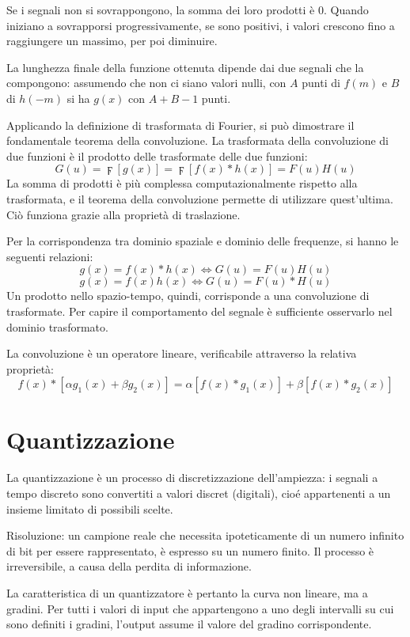 Se i segnali non si sovrappongono, la somma dei loro prodotti è 0. Quando iniziano a sovrapporsi progressivamente, se sono positivi, i valori crescono fino a raggiungere un massimo, per poi diminuire.

La lunghezza finale della funzione ottenuta dipende dai due segnali che la compongono: assumendo che non ci siano valori nulli, con $A$ punti di $f(m)$ e $B$ di $h(-m)$ si ha $g(x)$ con $A + B - 1$ punti.

Applicando la definizione di trasformata di Fourier, si può dimostrare il fondamentale teorema della convoluzione. La trasformata della convoluzione di due funzioni è il prodotto delle trasformate delle due funzioni: 
$$G(u) = \digamma[g(x)] = \digamma[f(x) * h(x)] = F(u)H(u)$$
La somma di prodotti è più complessa computazionalmente rispetto alla trasformata, e il teorema della convoluzione permette di utilizzare quest'ultima. Ciò funziona grazie alla proprietà di traslazione. 

Per la corrispondenza tra dominio spaziale e dominio delle frequenze, si hanno le seguenti relazioni:
$$g(x) = f(x) * h(x) \Longleftrightarrow G(u) = F(u)H(u)$$
$$g(x) = f(x)h(x) \Longleftrightarrow G(u) = F(u) * H(u)$$
Un prodotto nello spazio-tempo, quindi, corrisponde a una convoluzione di trasformate. Per capire il comportamento del segnale è sufficiente osservarlo nel dominio trasformato.

La convoluzione è un operatore lineare, verificabile attraverso la relativa proprietà:
$$f(x) * [\alpha g_1(x) + \beta g_2(x)] = \alpha[f(x) * g_1(x)] + \beta[f(x) * g_2(x)]$$

\section{Quantizzazione}
La quantizzazione è un processo di discretizzazione dell'ampiezza: i segnali a tempo discreto sono convertiti a valori discret (digitali), cioé appartenenti a un insieme limitato di possibili scelte.

Risoluzione: un campione reale che necessita ipoteticamente di un numero infinito di bit per essere rappresentato, è espresso su un numero finito. Il processo è irreversibile, a causa della perdita di informazione.

La caratteristica di un quantizzatore è pertanto la curva non lineare, ma a gradini. Per tutti i valori di input che appartengono a uno degli intervalli su cui sono definiti i gradini, l'output assume il valore del gradino corrispondente.

